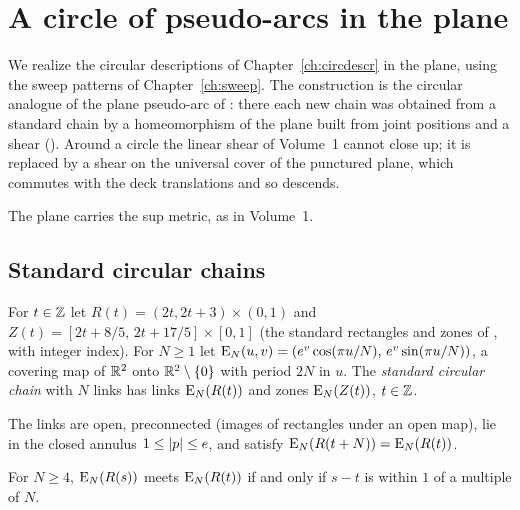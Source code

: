 \chapter{A circle of pseudo-arcs in the plane}\label{ch:plane}

We realize the circular descriptions of Chapter~\ref{ch:circdescr} in the plane, using the sweep patterns of Chapter~\ref{ch:sweep}. The construction is
the circular analogue of the plane pseudo-arc of : there each new chain was obtained from a standard chain by a homeomorphism of the plane
built from joint positions and a shear (). Around a circle the linear shear of Volume~1 cannot close up; it is replaced by a shear on the
universal cover of the punctured plane, which commutes with the deck translations and so descends.

The plane carries the sup metric, as in Volume~1.

\section{Standard circular chains}

\begin{definition}\label{def:std-circ}
For $t\in\mathbb{Z}$ let $R(t)=(2t,2t+3)\times(0,1)$ and $Z(t)=[2t+8/5,\,2t+17/5]\times[0,1]$ (the standard rectangles and zones of , with integer index). For
$N\ge1$ let $\operatorname{E}_N(u,v)=(e^v\cos(\pi u/N),\,e^v\sin(\pi u/N))$, a covering map of $\mathbb{R}^2$ onto $\mathbb{R}^2\setminus\left\{ 0 \right\}$ with period $2N$ in $u$. The \emph{standard circular chain}
with $N$ links has links $\operatorname{E}_N(R(t))$ and zones $\operatorname{E}_N(Z(t))$, $t\in\mathbb{Z}$.
\end{definition}


The links are open, preconnected (images of rectangles under an open map), lie in the closed annulus $1\le\left\lvert p\right\rvert\le e$, and satisfy $\operatorname{E}_N(R(t+N))=\operatorname{E}_N(R(t))$.


\begin{lemma}\label{lem:std-meet}
For $N\ge4$, $\operatorname{E}_N(R(s))$ meets $\operatorname{E}_N(R(t))$ if and only if $s-t$ is within $1$ of a multiple of $N$.
\end{lemma}

